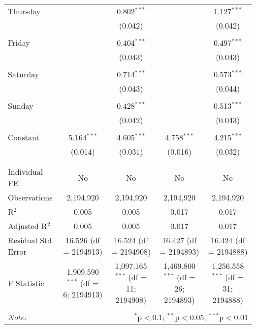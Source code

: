 \documentclass[
]{article}
\begin{document}
\begin{table}[!htbp]
{\begin{tabular}{@{\extracolsep{5pt}}lcccc}
 Thursday &  & 0.802$^{***}$ &  & 1.127$^{***}$ \\ 
  &  & (0.042) &  & (0.042) \\ 
  & & & & \\ 
 Friday &  & 0.404$^{***}$ &  & 0.497$^{***}$ \\ 
  &  & (0.043) &  & (0.043) \\ 
  & & & & \\ 
 Saturday &  & 0.714$^{***}$ &  & 0.573$^{***}$ \\ 
  &  & (0.043) &  & (0.044) \\ 
  & & & & \\ 
 Sunday &  & 0.428$^{***}$ &  & 0.513$^{***}$ \\ 
  &  & (0.042) &  & (0.043) \\ 
  & & & & \\ 
 Constant & 5.164$^{***}$ & 4.605$^{***}$ & 4.758$^{***}$ & 4.215$^{***}$ \\ 
  & (0.014) & (0.031) & (0.016) & (0.032) \\ 
  & & & & \\ 
\hline \\[-1.8ex] 
Individual FE & No & No & No & No \\ 
Observations & 2,194,920 & 2,194,920 & 2,194,920 & 2,194,920 \\ 
R$^{2}$ & 0.005 & 0.005 & 0.017 & 0.017 \\ 
Adjusted R$^{2}$ & 0.005 & 0.005 & 0.017 & 0.017 \\ 
Residual Std. Error & 16.526 (df = 2194913) & 16.524 (df = 2194908) & 16.427 (df = 2194893) & 16.424 (df = 2194888) \\ 
F Statistic & 1,909.590$^{***}$ (df = 6; 2194913) & 1,097.165$^{***}$ (df = 11; 2194908) & 1,469.800$^{***}$ (df = 26; 2194893) & 1,256.558$^{***}$ (df = 31; 2194888) \\ 
\hline 
\hline \\[-1.8ex] 
\textit{Note:}  & \multicolumn{4}{r}{$^{*}$p$<$0.1; $^{**}$p$<$0.05; $^{***}$p$<$0.01} \\ 
\end{tabular}
} 
\end{table} 
\newpage
\end{document}
